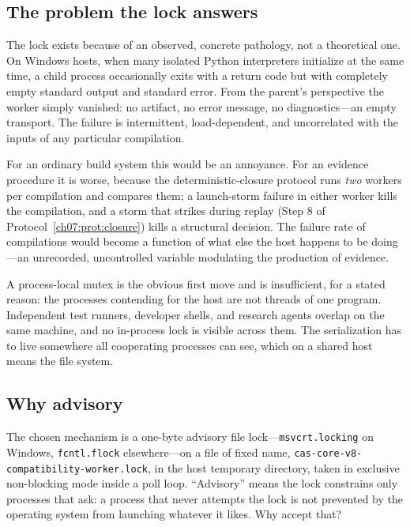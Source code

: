 \subsection{The problem the lock answers}\label{ch08:lock-problem}

The lock exists because of an observed, concrete pathology, not a theoretical one. On Windows hosts, when many isolated Python interpreters initialize at the same time, a child process occasionally exits with a return code but with completely empty standard output and standard error. From the parent's perspective the worker simply vanished: no artifact, no error message, no diagnostics---an empty transport. The failure is intermittent, load-dependent, and uncorrelated with the inputs of any particular compilation.

For an ordinary build system this would be an annoyance. For an evidence procedure it is worse, because the deterministic-closure protocol runs \emph{two} workers per compilation and compares them; a launch-storm failure in either worker kills the compilation, and a storm that strikes during replay (Step 8 of Protocol~\ref{ch07:prot:closure}) kills a structural decision. The failure rate of compilations would become a function of what else the host happens to be doing---an unrecorded, uncontrolled variable modulating the production of evidence.

A process-local mutex is the obvious first move and is insufficient, for a stated reason: the processes contending for the host are not threads of one program. Independent test runners, developer shells, and research agents overlap on the same machine, and no in-process lock is visible across them. The serialization has to live somewhere all cooperating processes can see, which on a shared host means the file system.

\subsection{Why advisory}\label{ch08:why-advisory}

The chosen mechanism is a one-byte advisory file lock---\texttt{msvcrt.locking} on Windows, \texttt{fcntl.flock} elsewhere---on a file of fixed name, \texttt{cas-core-v8-compatibility-worker.lock}, in the host temporary directory, taken in exclusive non-blocking mode inside a poll loop. ``Advisory'' means the lock constrains only processes that ask: a process that never attempts the lock is not prevented by the operating system from launching whatever it likes. Why accept that?

